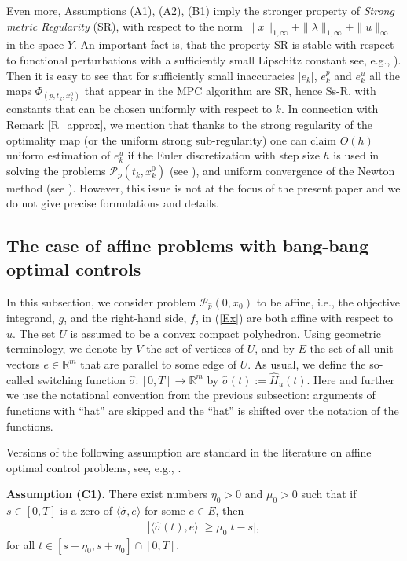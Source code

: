 \documentclass[11pt]{article}
\newcommand{\R}{\mathbb R}
\newcommand{\p}{{\mathcal P}}
\def\R{\mathbb{R}}
\newcommand{\bino}{\bigskip\noindent}
\begin{document}
Even more, Assumptions (A1), (A2), (B1) imply the stronger property of {\em Strong metric Regularity} (SR),
\cite[Sect.~3.7]{AD+TR-98} with respect to the norm $\| x \|_{1,\infty} + \| \lambda \|_{1,\infty} +  \| u \|_{\infty}$ 
in the space $Y$. An important fact is, that the property SR is stable with respect to functional perturbations with a 
sufficiently small Lipschitz constant see, e.g.,  \cite[Proposition 3G.2]{AD+TR-98}). Then it is easy to see that 
for sufficiently small inaccuracies $|e_k|$, $e_k^p$ and $e_k^{u}$ all the maps $\Phi_{(p,t_k,x_k^0)}$ 
that appear in the MPC algorithm are SR, 
hence Ss-R, with constants that can be chosen uniformly with respect to $k$. 
In connection with Remark \ref{R_approx}, we mention that thanks to the strong regularity of the optimality map 
(or the uniform strong sub-regularity)  one can claim $O(h)$ uniform estimation of $e_k^u$ if the Euler discretization
with step size $h$ is used in solving the problems $\p_p(t_k,x_k^0)$ (see \cite{AD+VV:CC-09}), and uniform 
convergence of the Newton method (see \cite{Aragon+...+VV-11}). 
However, this issue is not at the focus of the present paper and we do not give precise formulations and details.

\subsection{The case of affine problems with bang-bang optimal controls} \label{SSb-b} 

In this subsection, we consider problem $\mathcal P_{\hat p}(0,x_0)$ to be affine, i.e., 
the objective integrand, $g$, and the right-hand side, $f$, in (\ref{Ex}) are both affine with respect to $u$.  
The set $U$ is assumed to be a convex compact polyhedron. Using geometric terminology, 
we denote by $V$ the set of vertices  of $U$, and by $E$ the set of all unit vectors $e \in \R^m$ 
that are parallel to some edge of $U$.  
As usual, we define the so-called switching function $\hat\sigma:[0,T]\to\mathbb R^m$ by $\hat\sigma(t):=\hat H_u(t)$. 
Here and further we use the notational convention from  the previous subsection: arguments of functions with 
``hat'' are skipped and the ``hat'' is shifted over the notation of the functions.

Versions of the following assumption are standard in the literature on affine optimal control problems, 
see, e.g., \cite{WAlt+UF+MS-18,CVQ,Fel2003,Os+Ve-20}. 

\bino
{\bf Assumption (C1).}  There exist numbers $\eta_0 > 0$ and $\mu_0>0$ such that if $s \in[0,T]$ is a zero 
of $\langle \hat\sigma, e \rangle$ for some $e \in E$, then 
\begin{align*}
      |\langle \hat\sigma(t), e\rangle|\ge\mu_0|t-s|,
\end{align*}
for all $t\in [s-\eta_0,s+\eta_0] \cap [0,T]$.
\end{document}
